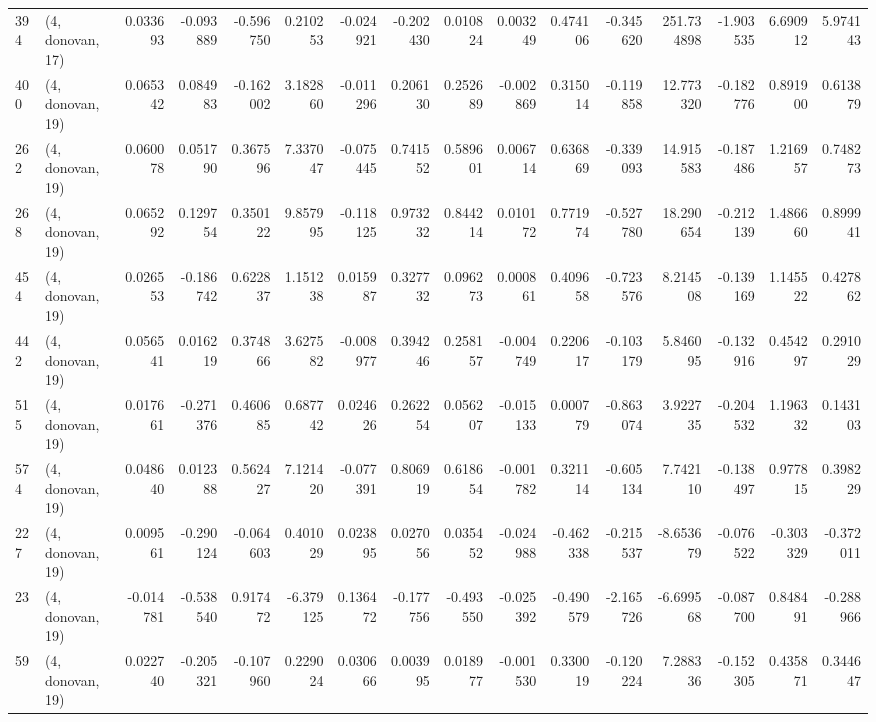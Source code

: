 \begin{tabular}{llrrrrrrrrrrrrrr}
394 &  (4, donovan, 17) &   0.033693 & -0.093889 & -0.596750 &    0.210253 & -0.024921 &  -0.202430 &  0.010824 &  0.003249 &  0.474106 & -0.345620 &  251.734898 & -1.903535 &  6.690912 &  5.974143 \\
400 &  (4, donovan, 19) &   0.065342 &  0.084983 & -0.162002 &    3.182860 & -0.011296 &   0.206130 &  0.252689 & -0.002869 &  0.315014 & -0.119858 &   12.773320 & -0.182776 &  0.891900 &  0.613879 \\
262 &  (4, donovan, 19) &   0.060078 &  0.051790 &  0.367596 &    7.337047 & -0.075445 &   0.741552 &  0.589601 &  0.006714 &  0.636869 & -0.339093 &   14.915583 & -0.187486 &  1.216957 &  0.748273 \\
268 &  (4, donovan, 19) &   0.065292 &  0.129754 &  0.350122 &    9.857995 & -0.118125 &   0.973232 &  0.844214 &  0.010172 &  0.771974 & -0.527780 &   18.290654 & -0.212139 &  1.486660 &  0.899941 \\
454 &  (4, donovan, 19) &   0.026553 & -0.186742 &  0.622837 &    1.151238 &  0.015987 &   0.327732 &  0.096273 &  0.000861 &  0.409658 & -0.723576 &    8.214508 & -0.139169 &  1.145522 &  0.427862 \\
442 &  (4, donovan, 19) &   0.056541 &  0.016219 &  0.374866 &    3.627582 & -0.008977 &   0.394246 &  0.258157 & -0.004749 &  0.220617 & -0.103179 &    5.846095 & -0.132916 &  0.454297 &  0.291029 \\
515 &  (4, donovan, 19) &   0.017661 & -0.271376 &  0.460685 &    0.687742 &  0.024626 &   0.262254 &  0.056207 & -0.015133 &  0.000779 & -0.863074 &    3.922735 & -0.204532 &  1.196332 &  0.143103 \\
574 &  (4, donovan, 19) &   0.048640 &  0.012388 &  0.562427 &    7.121420 & -0.077391 &   0.806919 &  0.618654 & -0.001782 &  0.321114 & -0.605134 &    7.742110 & -0.138497 &  0.977815 &  0.398229 \\
227 &  (4, donovan, 19) &   0.009561 & -0.290124 & -0.064603 &    0.401029 &  0.023895 &   0.027056 &  0.035452 & -0.024988 & -0.462338 & -0.215537 &   -8.653679 & -0.076522 & -0.303329 & -0.372011 \\
23  &  (4, donovan, 19) &  -0.014781 & -0.538540 &  0.917472 &   -6.379125 &  0.136472 &  -0.177756 & -0.493550 & -0.025392 & -0.490579 & -2.165726 &   -6.699568 & -0.087700 &  0.848491 & -0.288966 \\
59  &  (4, donovan, 19) &   0.022740 & -0.205321 & -0.107960 &    0.229024 &  0.030666 &   0.003995 &  0.018977 & -0.001530 &  0.330019 & -0.120224 &    7.288336 & -0.152305 &  0.435871 &  0.344647 \\

\end{tabular}
